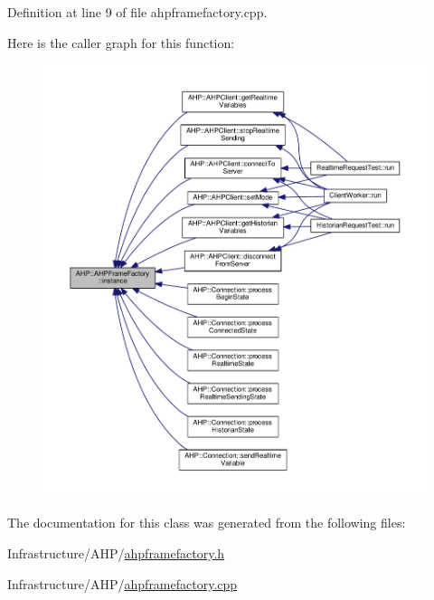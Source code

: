 Definition at line 9 of file ahpframefactory.\+cpp.



Here is the caller graph for this function\+:
\nopagebreak
\begin{figure}[H]
\begin{center}
\leavevmode
\includegraphics[width=350pt]{class_a_h_p_1_1_a_h_p_frame_factory_ae2bc68dc0dfa36eca9c75828774c1919_icgraph}
\end{center}
\end{figure}




The documentation for this class was generated from the following files\+:\begin{DoxyCompactItemize}
\item 
Infrastructure/\+A\+H\+P/\hyperlink{ahpframefactory_8h}{ahpframefactory.\+h}\item 
Infrastructure/\+A\+H\+P/\hyperlink{ahpframefactory_8cpp}{ahpframefactory.\+cpp}\end{DoxyCompactItemize}
